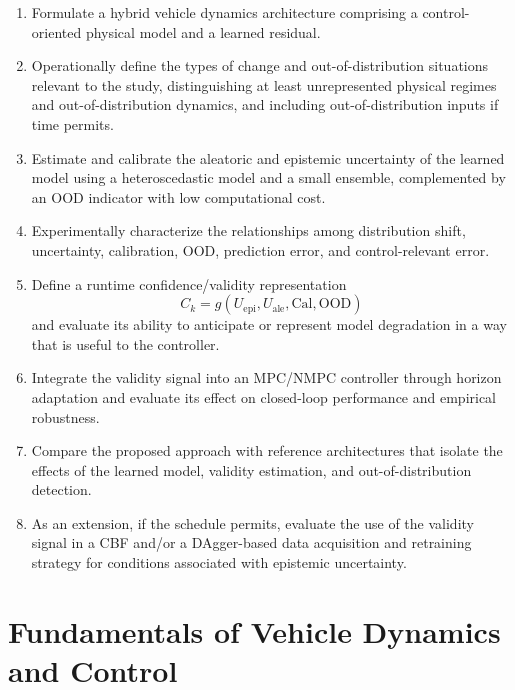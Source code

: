 \documentclass[12pt,a4paper]{report}
\begin{document}
\begin{enumerate}[label=\textbf{SO\arabic*:}]
    \item Formulate a hybrid vehicle dynamics architecture comprising a control-oriented physical model and a learned residual.

    \item Operationally define the types of change and out-of-distribution situations relevant to the study, distinguishing at least unrepresented physical regimes and out-of-distribution dynamics, and including out-of-distribution inputs if time permits.

    \item Estimate and calibrate the aleatoric and epistemic uncertainty of the learned model using a heteroscedastic model and a small ensemble, complemented by an OOD indicator with low computational cost.

    \item Experimentally characterize the relationships among distribution shift, uncertainty, calibration, OOD, prediction error, and control-relevant error.

    \item Define a runtime confidence/validity representation
    \[C_k=g(U_{\mathrm{epi}},U_{\mathrm{ale}},\mathrm{Cal},
    \mathrm{OOD})\]
    and evaluate its ability to anticipate or represent model degradation in a way that is useful to the controller.

    \item Integrate the validity signal into an MPC/NMPC controller through horizon adaptation and evaluate its effect on closed-loop performance and empirical robustness.

    \item Compare the proposed approach with reference architectures that isolate the effects of the learned model, validity estimation, and out-of-distribution detection.

    \item As an extension, if the schedule permits, evaluate the use of the validity signal in a CBF and/or a DAgger-based data acquisition and retraining strategy for conditions associated with epistemic uncertainty.
\end{enumerate}



\chapter{Fundamentals of Vehicle Dynamics and Control}
\end{document}
